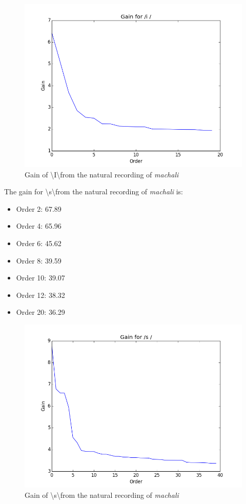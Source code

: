 \documentclass[a4paper]{article}
\begin{document}
\begin{figure}[h!]
    \includegraphics[width=\linewidth]{./images/gain_i.png}
    \caption{Gain of \textbackslash I\textbackslash from the natural recording of \textit{machali}}
    \label{fig:1}
\end{figure}

The gain for \textbackslash s\textbackslash from the natural recording of \textit{machali} is: 

\begin{itemize}
\item Order 2: 67.89 
\item Order 4: 65.96
\item Order 6: 45.62
\item Order 8: 39.59
\item Order 10: 39.07
\item Order 12: 38.32
\item Order 20: 36.29
\end{itemize}  


\begin{figure}[h!]
    \includegraphics[width=\linewidth]{./images/gain_s.png}
    \caption{Gain of \textbackslash s\textbackslash from the natural recording of \textit{machali}}
    \label{fig:1}
\end{figure}
\end{document}
